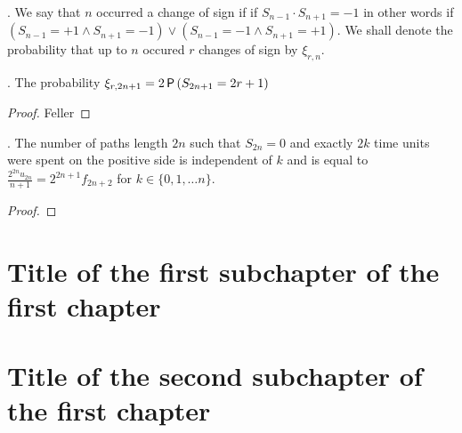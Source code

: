 \begin{defn}
  \Lrw. We say that \intime $n$ occurred a change of sign if if $S_{n-1}\cdot S_{n+1}=-1$ in other words if $\left(S_{n-1}=+1 \land S_{n+1}=-1\right) \lor \left(S_{n-1}=-1 \land S_{n+1}=+1\right).$ We shall denote the probability that up to \time $n$ occured $r$ changes of sign by $\xi_{r, n}$.
\end{defn}
\begin{thm}
  \Lrws. The probability $\xi_{r,2n+1}=2\operatorname{\textsf{P}}\left( S_{2n+1}=2r+1 \right)$
\end{thm}
\begin{proof}
  Feller
\end{proof}
\begin{thm}
  \Lrws. The number of paths length $2n$ such that $S_{2n}=0$ and exactly $2k$ time units were spent on the positive side is independent of $k$ and is equal to $\frac{2^{2n}u_{2n}}{n+1}=2^{2n+1}f_{2n+2}$ for $k \in \{0, 1, \ldots n\}$.
\end{thm}
\begin{proof}

\end{proof}


\section{Title of the first subchapter of the first chapter}

\section{Title of the second subchapter of the first chapter}
